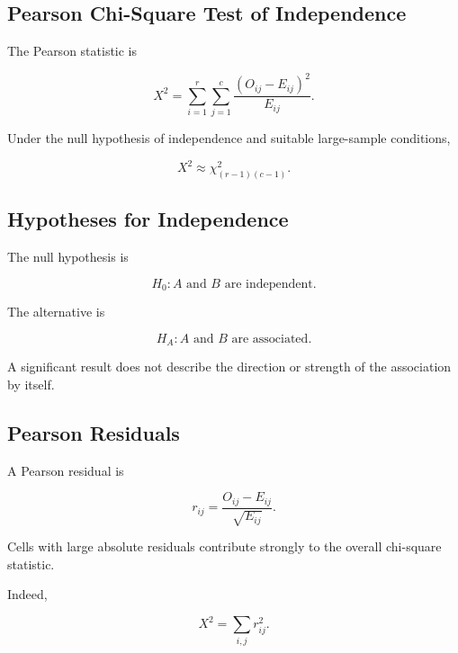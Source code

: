 \subsection{Pearson Chi-Square Test of Independence}
\label{subsec:pearson-chi-square-independence}

The Pearson statistic is

\[
\boxed{
X^2
=
\sum_{i=1}^{r}
\sum_{j=1}^{c}
\frac{
(O_{ij}-E_{ij})^2
}{
E_{ij}
}.
}
\]

Under the null hypothesis of independence and suitable large-sample
conditions,

\[
\boxed{
X^2
\approx
\chi^2_{(r-1)(c-1)}.
}
\]

\subsection{Hypotheses for Independence}
\label{subsec:hypotheses-independence-categorical}

The null hypothesis is

\[
\boxed{
H_0:
A
\text{ and }
B
\text{ are independent}.
}
\]

The alternative is

\[
\boxed{
H_A:
A
\text{ and }
B
\text{ are associated}.
}
\]

A significant result does not describe the direction or strength of the
association by itself.

\subsection{Pearson Residuals}
\label{subsec:pearson-residuals-categorical}

A Pearson residual is

\[
\boxed{
r_{ij}
=
\frac{
O_{ij}-E_{ij}
}{
\sqrt{E_{ij}}
}.
}
\]

Cells with large absolute residuals contribute strongly to the overall
chi-square statistic.

Indeed,

\[
\boxed{
X^2
=
\sum_{i,j}r_{ij}^2.
}
\]

